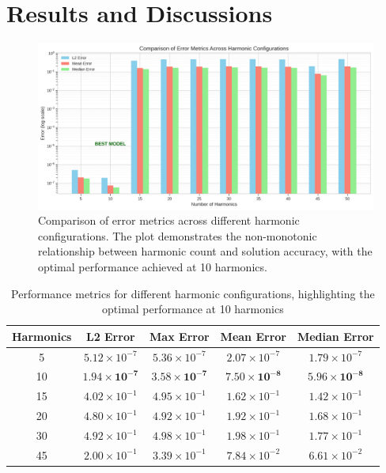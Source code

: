 \section{Results and Discussions}

\begin{figure}[ht]
    \centering
    \includegraphics[width = 1.0\linewidth]{figures/error_metrics_comparison.png}
    \caption{Comparison of error metrics across different harmonic configurations. The plot demonstrates the non-monotonic relationship between harmonic count and solution accuracy, with the optimal performance achieved at 10 harmonics.}
    \label{fig:error_metrics}
\end{figure}


\begin{table}[ht]
    \centering
    \caption{Performance metrics for different harmonic configurations, highlighting the optimal performance at 10 harmonics}
    \label{tab:harmonic_comparison}
    \begin{tabular}{|c|c|c|c|c|}
    \hline
    \textbf{Harmonics} & \textbf{L2 Error} & \textbf{Max Error} & \textbf{Mean Error} & \textbf{Median Error} \\ \hline
    5    & $5.12 \times 10^{-7}$ & $5.36 \times 10^{-7}$ & $2.07 \times 10^{-7}$ & $1.79 \times 10^{-7}$ \\ \hline
    10   & $\mathbf{1.94 \times 10^{-7}}$ & $\mathbf{3.58 \times 10^{-7}}$ & $\mathbf{7.50 \times 10^{-8}}$ & $\mathbf{5.96 \times 10^{-8}}$ \\ \hline
    15   & $4.02 \times 10^{-1}$ & $4.95 \times 10^{-1}$ & $1.62 \times 10^{-1}$ & $1.42 \times 10^{-1}$ \\ \hline
    20   & $4.80 \times 10^{-1}$ & $4.92 \times 10^{-1}$ & $1.92 \times 10^{-1}$ & $1.68 \times 10^{-1}$ \\ \hline
    30   & $4.92 \times 10^{-1}$ & $4.98 \times 10^{-1}$ & $1.98 \times 10^{-1}$ & $1.77 \times 10^{-1}$ \\ \hline
    45   & $2.00 \times 10^{-1}$ & $3.39 \times 10^{-1}$ & $7.84 \times 10^{-2}$ & $6.61 \times 10^{-2}$ \\ \hline
    \end{tabular}
\end{table}
